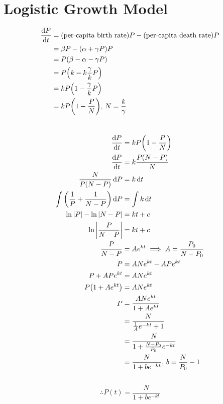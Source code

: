 \documentclass[a4paper]{article}
\begin{document}
\section{Logistic Growth Model}
\[\begin{aligned}
    \dv{P}{t}&=\pqty{\text{per-capita birth rate}}P-\pqty{\text{per-capita death rate}}P\\
    &=\beta P-\pqty{\alpha+\gamma P}P\\
    &=P\pqty{\beta-\alpha-\gamma P}\\
    &=P\pqty{k-k\frac{\gamma}kP}\\
    &=kP\pqty{1-\frac{\gamma}kP}\\
    &=kP\pqty{1-\frac PN},\,N=\frac k\gamma
\end{aligned}\]
\\
\[\begin{aligned}
    \dv{P}{t}&=kP\pqty{1-\frac PN}\\
    \dv{P}{t}&=k\frac{P\pqty{N-P}}N\\
    \frac N{P\pqty{N-P}}\dd{P}&=k\dd{t}\\
    \int\pqty{\frac1P+\frac1{N-P}}\dd{P}&=\int k\dd{t}\\
    \ln\abs{P}-\ln\abs{N-P}&=kt+c\\
    \ln\abs{\frac P{N-P}}&=kt+c\\
    \frac P{N-P}&=Ae^{kt}\implies A=\frac{P_0}{N-P_0}\\
    P&=ANe^{kt}-APe^{kt}\\
    P+APe^{kt}&=ANe^{kt}\\
    P\pqty{1+Ae^{kt}}&=ANe^{kt}\\
    P&=\frac{ANe^{kt}}{1+Ae^{kt}}\\
    &=\frac N{\frac1Ae^{-kt}+1}\\
    &=\frac N{1+\frac{N-P_0}{P_0}e^{-kt}}\\
    &=\frac N{1+be^{-kt}},\,b=\frac N{P_0}-1\\
\end{aligned}\]
\\
\[\therefore\boxed{P(t)=\frac N{1+be^{-kt}}}\]
\end{document}
